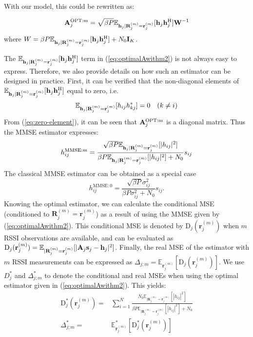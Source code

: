 \documentclass[francais]{gretsi}
\begin{document}
With our model, this could be rewritten as:

\begin{equation}
\bold{A}_j^{\mathrm{OPT:m}} = { \sqrt{\beta P}\mathbb{E}_{\bold{h}_j|\mathbf{R}_j^{(m)}=\mathbf{r}_j^{(m)}}[\bold{h}_j\bold{h}_j^{\mathrm{H}}] }\bold{W}^{-1}
\label{eq:optimalAwithm2}
\end{equation}
where $W={\beta P}\mathbb{E}_{\bold{h}_j|\mathbf{R}_j^{(m)}=\mathbf{r}_j^{(m)}}[\bold{h}_j\bold{h}_j^{\mathrm{H}}]+N_0\bold{I}_K$.


The $\mathbb{E}_{\bold{h}_j|\mathbf{R}_j^{(m)}=\mathbf{r}_j^{(m)}}[\bold{h}_j\bold{h}_j^{\mathrm{H}}]$ term in (\ref{eq:optimalAwithm2}) is not always easy to express. Therefore, we also provide details on how such an estimator can be designed in practice. First, it can be verified that the non-diagonal elements of $\mathbb{E}_{\bold{h}_j|\mathbf{R}_j^{(m)}=\mathbf{r}_j^{(m)}}[\bold{h}_j\bold{h}_j^{\mathrm{H}}]$ equal to zero, i.e.
\begin{equation}
\mathbb{E}_{\bold{h}_j|\mathbf{R}_j^{(m)}=\mathbf{r}_j^{(m)}}[h_{ij}h_{kj}^{*}]=0\quad(k\neq i)
\label{eq:zero-element}
\end{equation}
From (\ref{eq:zero-element}), it can be seen that $\bold{A}_j^{\mathrm{OPT:m}} $ is a diagonal matrix. Thus the MMSE estimator expresses:
\begin{equation}
\label{eq:mmse_gen}
{h}_{ij}^{\mathrm{MMSE}:m}=\frac{ \sqrt{\beta P}\mathbb{E}_{\bold{h}_j|\mathbf{R}_j^{(m)}=\mathbf{r}_j^{(m)}}[|{h}_{ij}|^2] }{{\beta P}\mathbb{E}_{\bold{h}_j|\mathbf{R}_j^{(m)}=\mathbf{r}_j^{(m)}}[|{h}_{ij}|^2]+N_0} s_{ij}
\end{equation}
The classical MMSE estimator can be obtained as a special case 
\begin{equation}
{h}_{ij}^{\mathrm{MMSE}:0}=\frac{ \sqrt{\beta P}\sigma_{ij}^2 }{{\beta P}\sigma_{ij}^2+N_0} s_{ij}.
\label{eq:MMSE_conventional}
\end{equation} 
Knowing the optimal estimator, we can calculate the conditional MSE (conditioned to $\mathbf{R}_j^{(m)}=\mathbf{r}_j^{(m)}$) as a result of using the MMSE given by (\ref{eq:optimalAwithm2}). This conditional MSE is denoted by $\mathrm{D}_{j}(\mathbf{r}_j^{(m)})$ when $m$ RSSI observations are available, and can be evaluated as $
\mathrm{D}_{j}(\mathbf{r}_j^{(m)})= \mathbb{E}_{|\mathbf{R}_j^{(m)}=\mathbf{r}_j^{(m)}}[|\bold{A}_j\bold{s}_j-\bold{h}_j|^2]$. Finally, the real MSE of the estimator with $m$ RSSI measurements can be expressed as $\Delta_{j;m}=\mathbb{E}_{\mathbf{r}_j^{(m)}}[\mathrm{D}_{j}(\mathbf{r}_j^{(m)})]$. We use $ D^*_{j} $ and $\Delta_{j;m}^*$ to denote the conditional and real MSEs when using the optimal estimator given in (\ref{eq:optimalAwithm2}). This yields:
\begin{align} 
 \label{eq:distor2}
\mathrm{D}_{j}^{*}(\mathbf{r}_j^{(m)})=&\sum_{i=1}^{N}\frac{N_0\mathbb{E}_{|\mathbf{R}_j^{(m)}=\mathbf{r}_j^{(m)}}[|h_{ij}|^2]}{\beta P\mathbb{E}_{|\mathbf{R}_j^{(m)}=\mathbf{r}_j^{(m)}}[|h_{ij}|^2]+N_0}
\\
 \label{eq:distor}
\Delta_{j;m}^{*}=&\mathbb{E}^{*}_{\mathbf{r}_j^{(m)}}[\mathrm{D}^{*}_{j}(\mathbf{r}_j^{(m)})]
\end{align}
\end{document}
